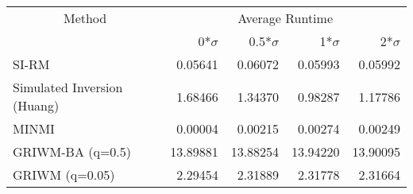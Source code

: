 
\begin{tabular}{lrrrr}
\toprule
\multicolumn{1}{c}{Method} & \multicolumn{4}{c}{Average Runtime} \\
 & 0*$\sigma$ & 0.5*$\sigma$ & 1*$\sigma$ & 2*$\sigma$\\
\midrule
SI-RM & 0.05641 & 0.06072 & 0.05993 & 0.05992\\
Simulated Inversion (Huang) & 1.68466 & 1.34370 & 0.98287 & 1.17786\\
MINMI & 0.00004 & 0.00215 & 0.00274 & 0.00249\\
GRIWM-BA (q=0.5) & 13.89881 & 13.88254 & 13.94220 & 13.90095\\
GRIWM (q=0.05) & 2.29454 & 2.31889 & 2.31778 & 2.31664\\
\bottomrule
\end{tabular}

